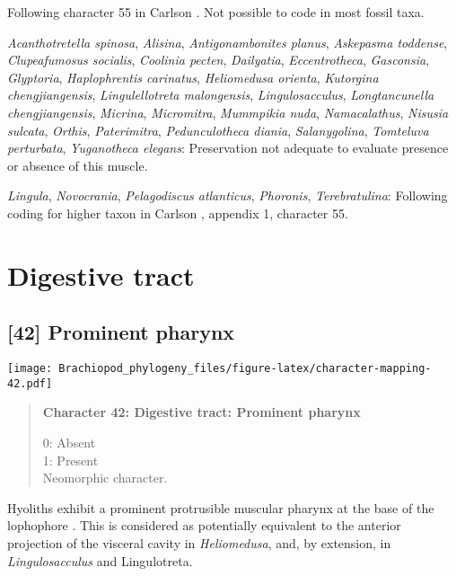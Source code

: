 \documentclass[openany]{book}
\theoremstyle{definition}
\theoremstyle{definition}
\theoremstyle{definition}
\theoremstyle{remark}
\begin{document}
Following character 55 in Carlson
\citeyearpar{Carlson1995Phylogeneticrelationships}. Not possible to code
in most fossil taxa.

\hypertarget{Acanthotretella_spinosa-coding-41}{}
\emph{Acanthotretella spinosa}, \emph{Alisina}, \emph{Antigonambonites
planus}, \emph{Askepasma toddense}, \emph{Clupeafumosus socialis},
\emph{Coolinia pecten}, \emph{Dailyatia}, \emph{Eccentrotheca},
\emph{Gasconsia}, \emph{Glyptoria}, \emph{Haplophrentis carinatus},
\emph{Heliomedusa orienta}, \emph{Kutorgina chengjiangensis},
\emph{Lingulellotreta malongensis}, \emph{Lingulosacculus},
\emph{Longtancunella chengjiangensis}, \emph{Micrina},
\emph{Micromitra}, \emph{Mummpikia nuda}, \emph{Namacalathus},
\emph{Nisusia sulcata}, \emph{Orthis}, \emph{Paterimitra},
\emph{Pedunculotheca diania}, \emph{Salanygolina}, \emph{Tomteluva
perturbata}, \emph{Yuganotheca elegans}: Preservation not adequate to
evaluate presence or absence of this muscle.

\hypertarget{Lingula-coding-41}{}
\emph{Lingula}, \emph{Novocrania}, \emph{Pelagodiscus atlanticus},
\emph{Phoronis}, \emph{Terebratulina}: Following coding for higher taxon
in Carlson \citeyearpar{Carlson1995Phylogeneticrelationships}, appendix
1, character 55.

\section{Digestive tract}\label{digestive-tract}

\subsection*{{[}42{]} Prominent pharynx}\label{prominent-pharynx}

\texttt{[image: Brachiopod\_phylogeny\_files/figure-latex/character-mapping-42.pdf]}

\begin{quote}
\textbf{Character 42: Digestive tract: Prominent pharynx}

0: Absent\\
1: Present\\
Neomorphic character.
\end{quote}

Hyoliths exhibit a prominent protrusible muscular pharynx at the base of
the lophophore \citep{Moysiuk2017Hyolithsare}. This is considered as
potentially equivalent to the anterior projection of the visceral cavity
in \emph{Heliomedusa}, and, by extension, in \emph{Lingulosacculus} and
Lingulotreta.
\end{document}
